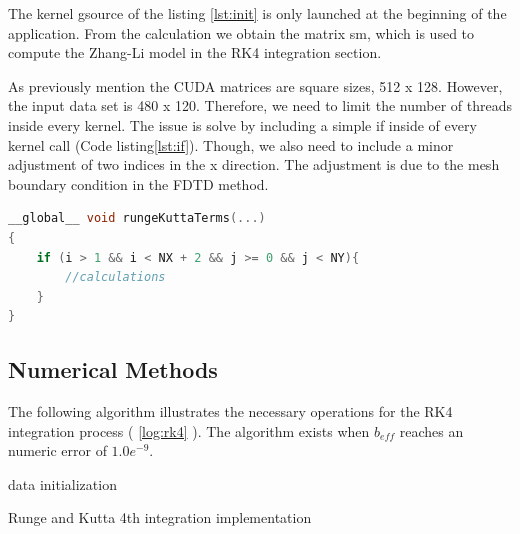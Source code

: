 The kernel {\listf gsource} of the listing \ref{lst:init} is only launched at the beginning of the application. From the calculation we obtain the matrix {\listf sm}, which is used to compute the Zhang-Li model in the RK4 integration section.

As previously mention the CUDA matrices are square sizes, 512 x 128. However, the input data set is 480 x 120. Therefore, we need to limit the number of threads inside every kernel. The issue is solve by including a simple {\listf if} inside of every kernel call (Code listing\ref{lst:if}). Though, we also need to include a minor adjustment of two indices in the x direction. The adjustment is due to the mesh boundary condition in the FDTD method.

\begin{lstlisting}[language=C++, label={lst:if}, caption={Limit threads executing inside a kernel}]
__global__ void rungeKuttaTerms(...)
{
    if (i > 1 && i < NX + 2 && j >= 0 && j < NY){
    	//calculations
    }
}
\end{lstlisting}

\subsection{Numerical Methods}

The following algorithm illustrates the necessary operations for the RK4 integration process ( \ref{log:rk4} ). The algorithm exists when $b_{eff}$ reaches an numeric error of $1.0e^{-9}$.

\begin{algorithm}[H]
 data initialization\;
 \label{log:rk4}
 \caption{Runge and Kutta 4th integration implementation}
\end{algorithm}

